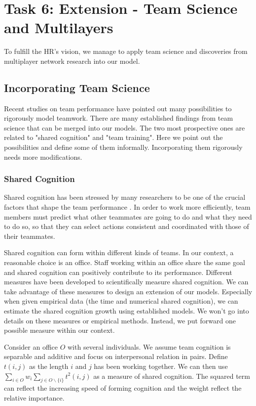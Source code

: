 \documentclass[tcn = 37075, sheet = false, abstract = false]{mcmthesis}
\begin{document}
\section{Task 6: Extension - Team Science and Multilayers}

To fulfill the HR's vision, we manage to apply team science and discoveries from multiplayer network research into our model.

\subsection{Incorporating Team Science}

Recent studies on team performance have pointed out many possibilities to rigorously model teamwork\cite{salas2008teams}. There are many established findings from team science that can be merged into our models. The two most prospective ones are related to "shared cognition" and "team training". Here we point out the possibilities and define some of them informally. Incorporating them rigorously needs more modifications.

\subsubsection{Shared Cognition}

Shared cognition has been stressed by many researchers to be one of the crucial factors that shape the team performance \cite{cannon2001reflections}. In order to work more efficiently, team members must predict what other teammates are going to do and what they need to do so, so that they can select actions consistent and coordinated with those of their teammates. \cite{mathieu2000influence}

Shared cognition can form within different kinds of teams. In our context, a reasonable choice is an office. Staff working within an office share the same goal and shared cognition can positively contribute to its performance. Different measures have been developed to scientifically measure shared cognition\cite{cannon2001reflections}. We can take advantage of these measures to design an extension of our models. Especially when given empirical data (the time and numerical shared cognition), we can estimate the shared cognition growth using established models. We won't go into details on these measures or empirical methods. Instead, we put forward one possible measure within our context.

Consider an office $O$ with several individuals. We assume team cognition is separable and additive and focus on interpersonal relation in pairs. Define $t(i,j)$ as the length $i$ and $j$ has been working together. We can then use $\sum\limits_{i\in O}w_i\sum\limits_{j\in O\backslash \{i\}}t^2(i,j)$ as a measure of shared cognition. The squared term can reflect the increasing speed of forming cognition and the weight reflect the relative importance.
\end{document}
